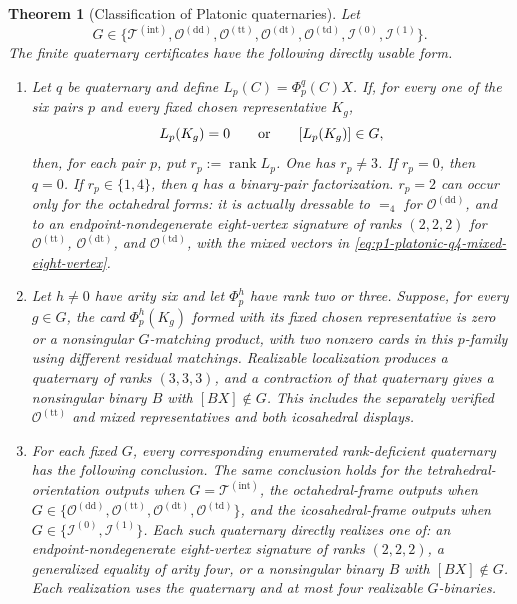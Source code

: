 \documentclass[11pt,letterpaper,onecolumn]{article}
\theoremstyle{plain}
\newtheorem{theorem}{Theorem}[section]
\theoremstyle{definition}
\theoremstyle{remark}
\newcommand{\TetInt}{{\mathcal T^{(\mathrm{int})}}}
\newcommand{\OctDD}{{\mathcal O^{(\mathrm{dd})}}}
\newcommand{\OctTT}{{\mathcal O^{(\mathrm{tt})}}}
\newcommand{\OctDT}{{\mathcal O^{(\mathrm{dt})}}}
\newcommand{\OctTD}{{\mathcal O^{(\mathrm{td})}}}
\newcommand{\IcoZero}{{\mathcal I^{(0)}}}
\newcommand{\IcoOne}{{\mathcal I^{(1)}}}
\newcommand{\rank}{\operatorname{rank}}
\newcommand{\Eq}{=}
\begin{document}
\begin{theorem}[Classification of Platonic quaternaries]
\label{thm:cert-interface-platonic-q4}
Let
\[
 G\in\{\TetInt,\OctDD,\OctTT,\OctDT,
 \OctTD,\IcoZero,\IcoOne\}.
\]
The finite quaternary certificates have the following directly usable form.
\begin{enumerate}[label=\textnormal{(\roman*)}]
\item Let \(q\) be quaternary and define
      \(L_p(C)=\Phi_p^q(C)X\).  If, for every one of the six pairs \(p\)
      and every fixed chosen representative \(K_g\),
      \[
      L_p(K_g)=0\qquad\hbox{or}\qquad[L_p(K_g)]\in G,
      \]
      then, for each pair \(p\), put \(r_p:=\rank L_p\).  One has
      \(r_p\ne3\).  If \(r_p=0\), then \(q=0\). If
      \(r_p\in\{1,4\}\), then \(q\) has a binary-pair factorization. \(r_p=2\) can occur only for the octahedral forms: it is actually
      dressable to \(\Eq_4\) for \(\OctDD\), and to an
      endpoint-nondegenerate eight-vertex signature of ranks \((2,2,2)\)
      for \(\OctTT\), \(\OctDT\), and \(\OctTD\),
      with the mixed vectors in
      \cref{eq:p1-platonic-q4-mixed-eight-vertex}.
\item Let \(h\ne0\) have arity six and let \(\Phi_p^h\) have rank two or
      three.  Suppose, for every \(g\in G\), the card
      \(\Phi_p^h(K_g)\) formed with its fixed chosen representative is zero
      or a nonsingular \(G\)-matching product, with two nonzero cards in
      this \(p\)-family using different residual matchings.  Realizable localization
      produces a quaternary of ranks \((3,3,3)\), and a contraction
      of that quaternary gives a nonsingular binary \(B\) with
      \([BX]\notin G\).  This includes the separately verified
      \(\OctTT\) and mixed representatives and both icosahedral
      displays.
\item For each fixed \(G\), every corresponding enumerated rank-deficient
      quaternary has the following conclusion.  The same conclusion holds
      for the tetrahedral-orientation outputs when \(G=\TetInt\), the
      octahedral-frame outputs when
      \(G\in\{\OctDD,\OctTT,\OctDT,\OctTD\}\),
      and the icosahedral-frame outputs
      when \(G\in\{\IcoZero,\IcoOne\}\).  Each such quaternary
      directly realizes one of: an
      endpoint-nondegenerate eight-vertex signature of ranks \((2,2,2)\), a
      generalized equality of arity four, or a nonsingular binary
      \(B\) with \([BX]\notin G\).  Each realization uses the quaternary and
      at most four realizable \(G\)-binaries.
\end{enumerate}
\end{theorem}
\end{document}
